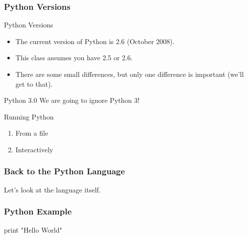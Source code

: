 \begin{frame}
\frametitle{Python Versions}

\begin{block}{Python Versions}
\begin{itemize}
\item The current version of Python is \alert{2.6} (October 2008).
\item This class assumes you have 2.5 or 2.6.
\item There are some small differences, but only one difference is important (we'll get to that).
\end{itemize}
\end{block}

\begin{block}{Python 3.0}
We are going to ignore Python 3!
\end{block}
\end{frame}

\begin{frame}[fragile]

\begin{block}{Running Python}
\begin{enumerate}
\item From a file
\item Interactively
\end{enumerate}
\end{block}

\end{frame}

\begin{frame}[fragile]
\frametitle{Back to the Python Language}
Let's look at the language itself.
\end{frame}

\begin{frame}[fragile]
\frametitle{Python Example}

\begin{python}
print "Hello World"
\end{python}
\end{frame}



